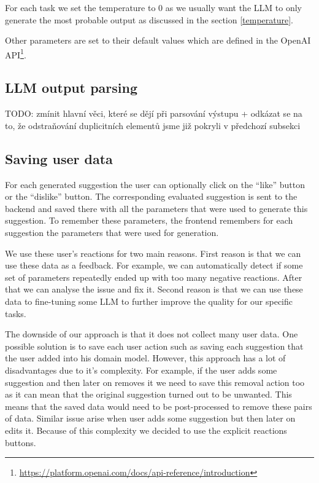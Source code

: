 For each task we set the temperature to $0$ as we usually want the LLM to only generate the most probable output as discussed in the section \ref{temperature}.

Other parameters are set to their default values which are defined in the OpenAI API\footnote{\url{https://platform.openai.com/docs/api-reference/introduction}}.


\subsection{LLM output parsing}

TODO: zmínit hlavní věci, které se dějí při parsování výstupu + odkázat se na to, že odstraňování duplicitních elementů jsme již pokryli v předchozí subsekci \\


\subsection{Saving user data}

For each generated suggestion the user can optionally click on the ``like'' button or the ``dislike'' button. The corresponding evaluated suggestion is sent to the backend and saved there with all the parameters that were used to generate this suggestion. To remember these parameters, the frontend remembers for each suggestion the parameters that were used for generation.

We use these user's reactions for two main reasons. First reason is that we can use these data as a feedback. For example, we can automatically detect if some set of parameters repeatedly ended up with too many negative reactions. After that we can analyse the issue and fix it. Second reason is that we can use these data to fine-tuning some LLM to further improve the quality for our specific tasks.

The downside of our approach is that it does not collect many user data. One possible solution is to save each user action such as saving each suggestion that the user added into his domain model. However, this approach has a lot of disadvantages due to it's complexity. For example, if the user adds some suggestion and then later on removes it we need to save this removal action too as it can mean that the original suggestion turned out to be unwanted. This means that the saved data would need to be post-processed to remove these pairs of data. Similar issue arise when user adds some suggestion but then later on edits it. Because of this complexity we decided to use the explicit reactions buttons.


